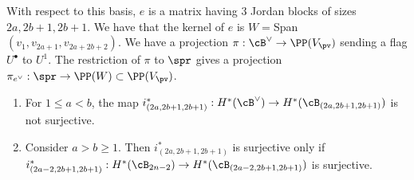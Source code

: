 \documentclass[12pt]{amsart}
\begin{document}
 With respect to this basis, $e$ is a matrix having $3$ Jordan blocks of sizes $2a, 2b+1, 2b+1$. We have that the kernel of $e$ is $W=$Span$(v_1, v_{2a+1}, v_{2a+2b+2})$. We have a projection $\pi: \cB^\vee\rightarrow \PP(V_\pv)$ sending a flag $U^\bullet$ to $U^1$. The restriction of $\pi$ to $\spr$ gives a projection $\pi_{e^\vee}: \spr\rightarrow \PP(W)\subset \PP(V_\pv)$. 

\begin{prop} \label{inductive non-surjectivity}\leavevmode
\begin{enumerate}
    \item For $1\leqslant a<b$, the map $i^{*}_{(2a,2b+1,2b+1)}: H^*(\cB^\vee)\rightarrow H^*(\cB_{(2a,2b+1,2b+1)})$ is not surjective.
    \item Consider $a>b\geqslant 1$. Then $i^{*}_{(2a,2b+1,2b+1)}$ is surjective only if $i^{*}_{(2a-2,2b+1,2b+1)}: H^*(\cB_{2n-2})\rightarrow H^*(\cB_{(2a-2,2b+1,2b+1)})$ is surjective.
\end{enumerate}
   
\end{prop}
\end{document}
